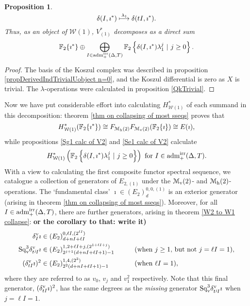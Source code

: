 \documentclass[11pt]{amsart}
\theoremstyle{plain}
\newtheorem{prop}[thm]{Proposition}
\theoremstyle{definition}
\newcommand{\calW}{\mathcal{W}}
\newcommand{\calw}{\mathcal{W}}
\newcommand{\calmv}{\mathcal{M}_\textup{v}}
\newcommand{\calmh}{\mathcal{M}_\textup{h}}
\theoremstyle{plain}
\newcommand{\Sq}{\mathrm{Sq}}
\newcommand{\aDTirr}{\textup{adm}_+^\textup{irr}(\Delta,T)}
\newcommand{\F}{\mathbb{F}}
\begin{document}
\begin{Calculations of HW0}
\begin{prop}
\[\delta(I,\imath^*)\overset{\smash{\lambda_1}}{\longmapsto }\delta(tI,\imath^*).\]
Thus, as an object of $\calW(1)$, $V^*_{(1)}$ decomposes as a direct sum
\[\F_2\{\imath^*\}\oplus\bigoplus_{\smash{I\in \aDTirr}}\F_2\left\{\delta(I,\imath^*)\lambda_1^j\ |\ j\geq0\right\}.\]
\end{prop}
\begin{proof}
The basis of the Koszul complex was described in proposition \ref{propDerivedIndTrivialUobject n=0}, and the Koszul differential is zero as $X$ is trivial. The $\lambda$-operations were calculated in proposition \ref{QkTrivial}.
\end{proof}
Now we have put considerable effort into calculating $H^*_{\calw(1)}$ of each summand in this decomposition: theorem \ref{thm on collapsing of most sseqs} proves that
\[H^*_{\calw(1)}(\F_2\{\imath^*\})\cong F_{\calmh(2)}F_{\calmv(2)}(\F_2\{\imath\})\cong E(\imath),\]
while propositions \ref{Sg1 calc of V2} and \ref{Se1 calc of V2} calculate
\[H^*_{\calw(1)}\left(\F_2\left\{\delta(I,\imath^*)\lambda_1^j\ |\ j\geq0\right\}\right)\textup{ for $I\in\aDTirr$.}\]
With a view to calculating the first composite functor spectral sequence,
we catalogue a collection of generators of $E_{2,(1)}$ under the $\calmv(2)$- and $\calmh(2)$-operations. The `fundamental class' $\imath\in (E_2)^{0,0,(1)}_{d}$ is an exterior generator (arising in theorem  \ref{thm on collapsing of most sseqs}). %
Moreover, for all $I\in\aDTirr$, there are further generators, arising in theorem \ref{W2 to W1 collapse}: \textbf{or the corollary to that: write it)}
\begin{alignat*}{2}
\delta_I^{\textup{v}}\imath&\in (E_2)^{0,\ell I,(2^{\ell I})}_{d+nI+\ell I}&\qquad&\\
\Sq_{\textup{v}}^{3}\delta_{t^j\!I}^{\textup{v}}\imath&\in (E_2)^{1,2+\ell I+j,(2^{1+\ell I+j})}_{2^{j+1}(d+nI+\ell I+1)-1}&\qquad&\textup{(when $j\geq1$, but not $j=\ell I=1$),}\\
(\delta_{tI}^{\textup{v}}\imath)^{2}&\in (E_2)^{1,4,(2^{3})}_{2^{2}(d+nI+\ell I+1)-1}&\qquad&\textup{(when $\ell I=1$)},
\end{alignat*}
where they are referred to  as $v_0$, $v_j$ and $v_1^2$ respectively.
Note that this final generator, $(\delta_{tI}^{\textup{v}}\imath)^{2}$, has the same degrees as the \emph{missing} generator $\Sq_{\textup{v}}^{3}\delta_{t^j\!I}^{\textup{v}}\imath$ when $j=\ell I=1$.

\end{Calculations of HW0}
\end{document}
